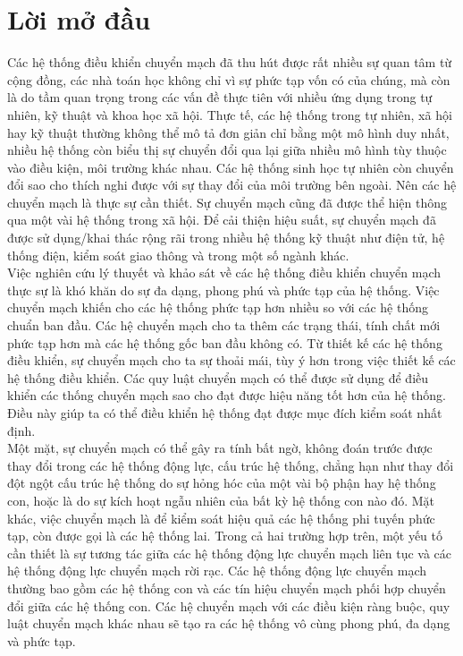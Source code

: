 \documentclass[14pt,a4paper,oneside]{report}		%
\theoremstyle{definition}
\begin{document}
\chapter*{Lời mở đầu}
Các hệ thống điều khiển chuyển mạch đã thu hút được rất nhiều sự quan tâm từ cộng đồng, các nhà toán học không chỉ vì sự phức tạp vốn có của chúng, mà còn là do tầm quan trọng trong các vấn đề thực tiên với nhiều ứng dụng trong tự nhiên, kỹ thuật và khoa học xã hội. Thực tế, các hệ thống trong tự nhiên, xã hội hay kỹ thuật thường không thể mô tả đơn giản chỉ bằng một mô hình duy nhất, nhiều hệ thống còn biểu thị sự chuyển đổi qua lại giữa nhiều mô hình tùy thuộc vào điều kiện, môi trường khác nhau. Các hệ thống sinh học tự nhiên còn chuyển đổi sao cho thích nghi được với sự thay đổi của môi trường bên ngoài. Nên các hệ chuyển mạch là thực sự cần thiết. Sự chuyển mạch cũng đã được thể hiện thông qua một vài hệ thống trong xã hội. Để cải thiện hiệu suất, sự chuyển mạch đã được sử dụng/khai thác rộng rãi trong nhiều hệ thống kỹ thuật như điện tử, hệ thống điện, kiểm soát giao thông và trong một số ngành khác.\\

Việc nghiên cứu lý thuyết và khảo sát về các hệ thống điều khiển chuyển mạch thực sự là khó khăn do sự đa dạng, phong phú và phức tạp của hệ thống. Việc chuyển mạch khiến cho các hệ thống phức tạp hơn nhiều so với các hệ thống chuẩn ban đầu. Các hệ chuyển mạch cho ta thêm các trạng thái, tính chất mới phức tạp hơn mà các hệ thống gốc ban đầu không có. Từ thiết kế các hệ thống điều khiển, sự chuyển mạch cho ta sự thoải mái, tùy ý hơn trong việc thiết kế các hệ thống điều khiển. Các quy luật chuyển mạch có thể được sử dụng để điều khiển các thống chuyển mạch sao cho đạt được hiệu năng tốt hơn của hệ thống. Điều này giúp ta có thể điều khiển hệ thống đạt được mục đích kiểm soát nhất định.\\

Một mặt, sự chuyển mạch có thể gây ra tính bất ngờ, không đoán trước được thay đổi trong các hệ thống động lực, cấu trúc hệ thống, chẳng hạn như thay đổi đột ngột cấu trúc hệ thống do sự hỏng hóc của một vài bộ phận hay hệ thống con, hoặc là do sự kích hoạt ngẫu nhiên của bất kỳ hệ thống con nào đó. Mặt khác, việc chuyển mạch là để kiểm soát hiệu quả các hệ thống phi tuyến phức tạp, còn được gọi là các hệ thống lai. Trong cả hai trường hợp trên, một yếu tố cần thiết là sự tương tác giữa các hệ thống động lực chuyển mạch liên tục và các hệ thống động lực chuyển mạch rời rạc. Các hệ thống động lực chuyển mạch thường bao gồm các hệ thống con và các tín hiệu chuyển mạch phối hợp chuyển đổi giữa các hệ thống con. Các hệ chuyển mạch với các điều kiện ràng buộc, quy luật chuyển mạch khác nhau sẽ tạo ra các hệ thống vô cùng phong phú, đa dạng và phức tạp.\\
\end{document}
